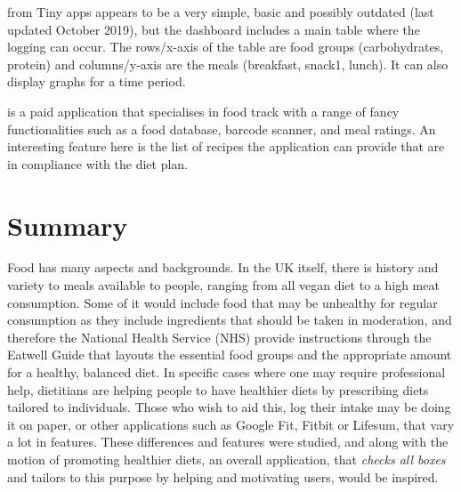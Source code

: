 \documentclass[../main.tex]{subfiles}
\begin{document}
\textbf{} from Tiny apps appears to be a very simple, basic and possibly outdated (last updated October 2019), but the dashboard includes a main table where the logging can occur. The rows/x-axis of the table are food groups (carbohydrates, protein) and columns/y-axis are the meals (breakfast, snack1, lunch). It can also display graphs for a time period.

\textbf{} is a paid application that specialises in food track with a range of fancy functionalities such as a food database, barcode scanner, and meal ratings. An interesting feature here is the list of recipes the application can provide that are in compliance with the diet plan.

\section*{Summary}

Food has many aspects and backgrounds. In the UK itself, there is history and variety to meals available to people, ranging from all vegan diet to a high meat consumption. Some of it would include food that may be unhealthy for regular consumption as they include ingredients that should be taken in moderation, and therefore the National Health Service (NHS) provide instructions through the Eatwell Guide that layouts the essential food groups and the appropriate amount for a healthy, balanced diet. In specific cases where one may require professional help, dietitians are helping people to have healthier diets by prescribing diets tailored to individuals. Those who wish to aid this, log their intake may be doing it on paper, or other applications such as Google Fit, Fitbit or Lifesum, that vary a lot in features. These differences and features were studied, and along with the motion of promoting healthier diets, an overall application, that \textit{checks all boxes} and tailors to this purpose by helping and motivating users, would be inspired.
\end{document}
